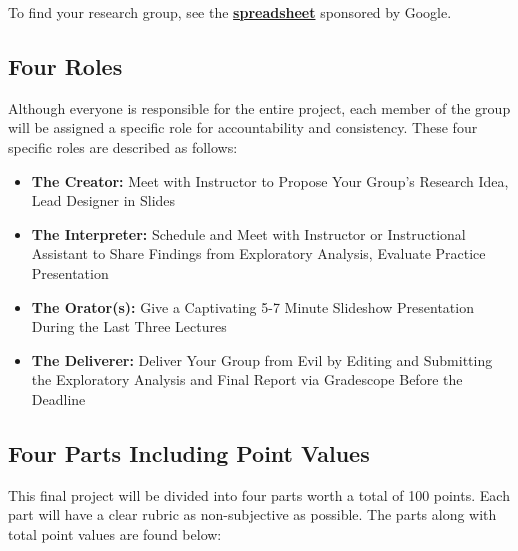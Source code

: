 \documentclass[
]{article}
\begin{document}
To find your research group, see the
\textbf{\href{https://docs.google.com/spreadsheets/d/10gwXH2bWP3iTnW9p6air6PypyP1JkartuFJmSkvais0/edit?usp=sharing}{spreadsheet}}
sponsored by Google.

\hypertarget{four-roles}{%
\subsection{Four Roles}\label{four-roles}}

Although everyone is responsible for the entire project, each member of
the group will be assigned a specific role for accountability and
consistency. These four specific roles are described as follows:

\begin{itemize}
\item
  \textbf{The Creator:} Meet with Instructor to Propose Your Group's
  Research Idea, Lead Designer in Slides
\item
  \textbf{The Interpreter:} Schedule and Meet with Instructor or
  Instructional Assistant to Share Findings from Exploratory Analysis,
  Evaluate Practice Presentation
\item
  \textbf{The Orator(s):} Give a Captivating 5-7 Minute Slideshow
  Presentation During the Last Three Lectures
\item
  \textbf{The Deliverer:} Deliver Your Group from Evil by Editing and
  Submitting the Exploratory Analysis and Final Report via Gradescope
  Before the Deadline
\end{itemize}

\hypertarget{four-parts-including-point-values}{%
\subsection{Four Parts Including Point
Values}\label{four-parts-including-point-values}}

This final project will be divided into four parts worth a total of 100
points. Each part will have a clear rubric as non-subjective as
possible. The parts along with total point values are found below:
\end{document}
